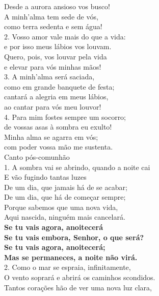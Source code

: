 \documentclass{book}
\begin{document}
\begin{flushleft}
    Desde a aurora ansioso vos busco! \\
    A minh'alma tem sede de vós, \\
    como terra sedenta e sem água! \\
    2. Vosso amor vale mais do que a vida: \\
    e por isso meus lábios vos louvam. \\
    Quero, pois, vos louvar pela vida \\
    e elevar para vós minhas mãos! \\
    3. A minh'alma será saciada, \\
    como em grande banquete de festa; \\
    cantará a alegria em meus lábios, \\
    ao cantar para vós meu louvor! \\
    4. Para mim fostes sempre um socorro; \\
    de vossas asas à sombra eu exulto! \\
    Minha alma se agarra em vós; \\
    com poder vossa mão me sustenta.
    \vspace{.2cm} \\
    \textcolor{VioletRed2}{Canto pós-comunhão}
    \vspace{.2cm} \\
    1. A sombra vai se abrindo, quando a noite cai \\
    E vão fugindo tantas luzes \\
    De um dia, que jamais há de se acabar; \\
    De um dia, que há de começar sempre; \\
    Porque sabemos que uma nova vida, \\
    Aqui nascida, ninguém mais cancelará.
    \vspace{.2cm} \\
    \textbf{Se tu vais agora, anoitecerá \\
        Se tu vais embora, Senhor, o que será? \\
        Se tu vais agora, anoitecerá; \\
        Mas se permaneces, a noite não virá.}
    \vspace{.2cm} \\
    2. Como o mar se espraia, infinitamente, \\
    O vento soprará e abrirá os caminhos scondidos. \\
    Tantos corações hão de ver uma nova luz clara, \\

\end{flushleft}
\end{document}
